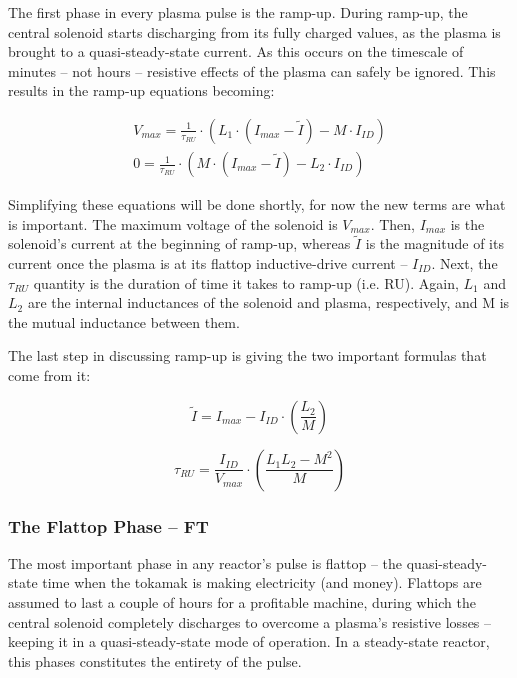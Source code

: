 The first phase in every plasma pulse is the ramp-up. During ramp-up, the central solenoid starts discharging from its fully charged values, as the plasma is brought to a quasi-steady-state current. As this occurs on the timescale of minutes -- not hours -- resistive effects of the plasma can safely be ignored. This results in the ramp-up equations becoming:

\begin{align}
	V_{max} = \frac{1}{\tau_{RU}} \cdot \left( L_1 \cdot ( I_{max} - \tilde I ) - M \cdot I_{ID} \right) \\
	0 = \frac{1}{\tau_{RU}} \cdot \left( M \cdot ( I_{max} - \tilde I ) - L_2 \cdot I_{ID} \right)
\end{align}

Simplifying these equations will be done shortly, for now the new terms are what is important. The maximum voltage of the solenoid is $V_{max}$. Then, $I_{max}$ is the solenoid's current at the beginning of ramp-up, whereas $\tilde I$ is the magnitude of its current once the plasma is at its flattop inductive-drive current -- $I_{ID}$. Next, the $\tau_{RU}$ quantity is the duration of time it takes to ramp-up (i.e. RU). Again, $L_1$ and $L_2$ are the internal inductances of the solenoid and plasma, respectively, and M is the mutual inductance between them.

The last step in discussing ramp-up is giving the two important formulas that come from it:

\begin{equation}
	\tilde I = I_{max} - I_{ID} \cdot \left( \frac{L_2}{M} \right)
\end{equation}

\begin{equation}
	\label{eq:tauru}
	\tau_{RU} = \frac{I_{ID}}{V_{max}} \cdot \left( \frac{ L_1 L_2 - M^2 }{ M } \right)
\end{equation}

\subsubsection{The Flattop Phase -- FT}

The most important phase in any reactor's pulse is flattop -- the quasi-steady-state time when the tokamak is making electricity (and money). Flattops are assumed to last a couple of hours for a profitable machine, during which the central solenoid completely discharges to overcome a plasma's resistive losses -- keeping it in a quasi-steady-state mode of operation. In a steady-state reactor, this phases constitutes the entirety of the pulse.

